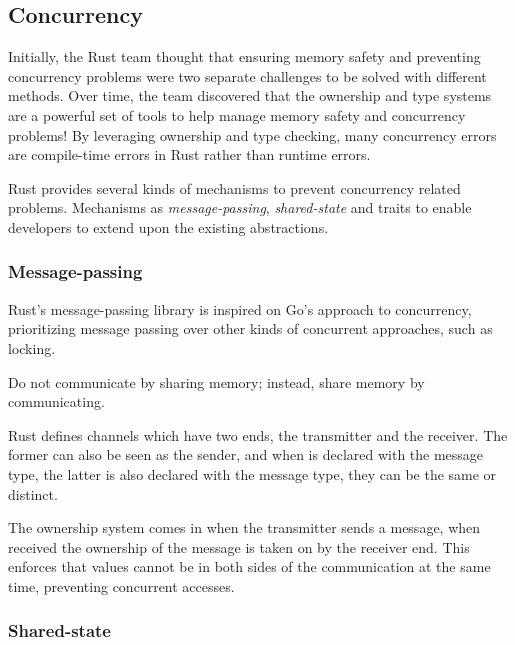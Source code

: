 \subsection{Concurrency}\label{sec:rust-lang:concurrency}

\begin{displayquote}
    Initially, the Rust team thought that ensuring memory safety and preventing concurrency problems were two separate challenges to be solved with different methods.
    Over time, the team discovered that the ownership and type systems are a powerful set of tools to help manage memory safety and concurrency problems!
    By leveraging ownership and type checking, many concurrency errors are compile-time errors in Rust rather than runtime errors.
\end{displayquote}

Rust provides several kinds of mechanisms to prevent concurrency related problems.
Mechanisms as \emph{message-passing}, \emph{shared-state} and
traits to enable developers to extend upon the existing abstractions.

\subsubsection*{Message-passing}

Rust's message-passing library is inspired on Go's approach to concurrency,
prioritizing message passing over other kinds of concurrent approaches, such as locking.

\begin{displayquote}[{\autocite[Concurrency]{Go2021}}]
    Do not communicate by sharing memory; instead, share memory by communicating.
\end{displayquote}

Rust defines channels which have two ends, the transmitter and the receiver.
The former can also be seen as the sender, and when is declared with the message type,
the latter is also declared with the message type, they can be the same or distinct.

The ownership system comes in when the transmitter sends a message,
when received the ownership of the message is taken on by the receiver end.
This enforces that values cannot be in both sides of the communication at the same time,
preventing concurrent accesses.

\subsubsection*{Shared-state}

